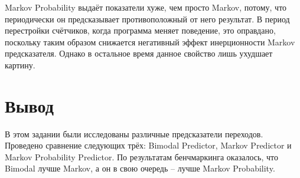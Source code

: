 	Markov Probability выдаёт показатели хуже, чем просто Markov, потому, что периодически он предсказывает противоположный от него результат. В период перестройки счётчиков, когда программа меняет поведение, это оправдано, поскольку таким образом снижается негативный эффект инерционности Markov предсказателя. Однако в остальное время данное свойство лишь ухудшает картину.
	
	\newpage
	
	\section*{Вывод}
	В этом задании были исследованы различные предсказатели переходов. Проведено сравнение следующих трёх: Bimodal Predictor, Markov Predictor и Markov Probability Predictor. По результатам бенчмаркинга оказалось, что Bimodal лучше Markov, а он в свою очередь -- лучше Markov Probability.

